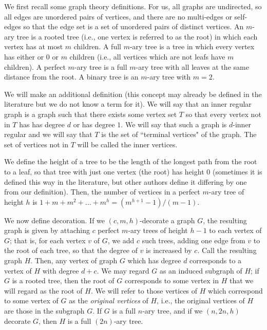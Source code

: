 \documentclass[letterpaper,onecolumn]{quantumarticle}
\begin{document}
We first recall some graph theory definitions.  For us, all graphs are undirected, so all edges are unordered pairs of vertices, and there are no multi-edges or self-edges so that the edge set is a set of unordered pairs of distinct vertices.
An $m$-ary tree is a rooted tree (i.e., one vertex is referred to as the root) in which each vertex has at most $m$ children.  A full $m$-ary tree is a tree in which every vertex has either or $0$ or $m$ children (i.e., all vertices which are not leafs have $m$ children).
A perfect $m$-ary tree is a full $m$-ary tree with all leaves at the same distance from the root.  A binary tree is an $m$-ary tree with $m=2$.

We will  make an additional definition (this concept may already be defined in the literature but we do not know a term for it).  We will say that an inner regular graph is a graph such that
there exists some vertex set $T$ so that every vertex not in $T$ has
 has degree $d$ or has degree $1$.  We will say that such a graph is $d$-inner regular and we will say that $T$ is the set of ``terminal vertices" of the graph.  The set of vertices not in $T$ will be called the inner vertices.
 


We define the height of a tree to be the length of the longest path from the root to a leaf, so that tree with just one vertex (the root) has height $0$ (sometimes it is defined this way in the literature, but other authors define it differing by one from our definition).
Then, the number of vertices in a perfect $m$-ary tree of height $h$ is
$1+m+m^2+\ldots+m^{h}=(m^{h+1}-1)/(m-1)$.



We now define decoration.  If we $(c,m,h)$-decorate a graph $G$, the resulting graph is given by attaching
$c$ perfect $m$-ary trees of height $h-1$ to each vertex of $G$; that is, for each vertex $v$ of $G$, we add $c$ such trees, adding one edge from $v$ to the root of each tree, so that the degree of $v$ is increased by $c$.
Call the resulting graph $H$.
Then, any vertex of graph $G$ which has degree $d$ corresponds to a vertex of $H$ with degree $d+c$.
We may regard $G$ as an induced subgraph of $H$; if $G$ is a rooted tree, then the root of $G$ corresponds to some vertex in $H$ that we will regard as the root of $H$.
We will refer to those vertices of $H$ which correspond to some vertex of $G$ as the {\it original vertices} of $H$, i.e., the original vertices of $H$ are those in the subgraph $G$.
If $G$ is a full $n$-ary tree, and if we $(n,2n,h)$ decorate $G$, then $H$ is a full $(2n)$-ary tree.
\end{document}
